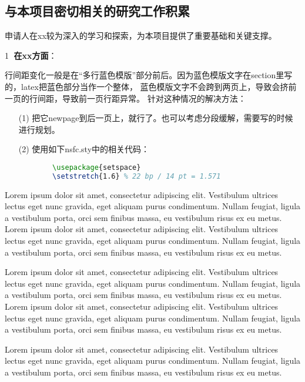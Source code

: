 
\subsection{与本项目密切相关的研究工作积累}
申请人在xx较为深入的学习和探索，为本项目提供了重要基础和关键支撑。

\textcircled{\small 1} {\bfseries 在xx方面}：

行间距变化一般是在“多行蓝色模版”部分前后。因为蓝色模版文字在section里写的，latex把蓝色部分当作一个整体，
蓝色模版文字不会跨到两页上，导致会挤前一页的行间距，导致前一页行距异常。
针对这种情况的解决方法：
\begin{itemize}
	\item[(1)] 把它newpage到后一页上，就行了。也可以考虑分段缓解，需要写的时候进行规划。
	\item[(2)] 使用如下nsfc.sty中的相关代码：
	\begin{lstlisting}[language=tex, basicstyle=\ttfamily\small, keywordstyle=\color{blue}, commentstyle=\color{gray}]
		%自动段落的行间距微调
		\usepackage{setspace}
		\setstretch{1.6} % 22 bp / 14 pt = 1.571
	\end{lstlisting}
\end{itemize}

Lorem ipsum dolor sit amet, consectetur adipiscing elit. Vestibulum ultrices lectus eget nunc gravida, eget aliquam purus condimentum. Nullam feugiat, ligula a vestibulum porta, orci sem finibus massa, eu vestibulum risus ex eu metus. 
Lorem ipsum dolor sit amet, consectetur adipiscing elit. Vestibulum ultrices lectus eget nunc gravida, eget aliquam purus condimentum. Nullam feugiat, ligula a vestibulum porta, orci sem finibus massa, eu vestibulum risus ex eu metus.

Lorem ipsum dolor sit amet, consectetur adipiscing elit. Vestibulum ultrices lectus eget nunc gravida, eget aliquam purus condimentum. Nullam feugiat, ligula a vestibulum porta, orci sem finibus massa, eu vestibulum risus ex eu metus. 
Lorem ipsum dolor sit amet, consectetur adipiscing elit. Vestibulum ultrices lectus eget nunc gravida, eget aliquam purus condimentum. Nullam feugiat, ligula a vestibulum porta, orci sem finibus massa, eu vestibulum risus ex eu metus.

Lorem ipsum dolor sit amet, consectetur adipiscing elit. Vestibulum ultrices lectus eget nunc gravida, eget aliquam purus condimentum. Nullam feugiat, ligula a vestibulum porta, orci sem finibus massa, eu vestibulum risus ex eu metus.